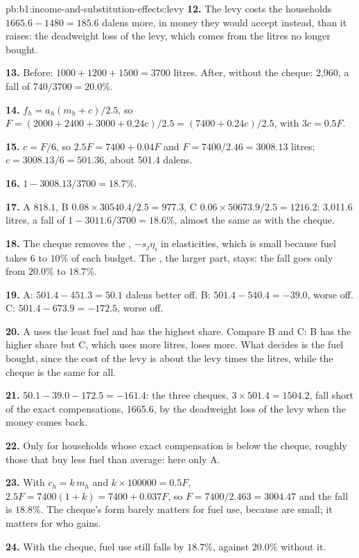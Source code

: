 \begin{solution}{pb:b1:income-and-substitution-effects:levy}
\textbf{12.} The levy costs the households $1665.6 - 1480 = 185.6$ dalens more,
in money they would accept instead, than it raises: the deadweight loss of
the levy, which comes from the litres no longer bought.

\textbf{13.} Before: $1000 + 1200 + 1500 = 3700$ litres. After, without the cheque:
2,960, a fall of $740/3700 = 20.0\%$.

\textbf{14.} $f_h = a_h(m_h + c)/2.5$, so
$F = (2000 + 2400 + 3000 + 0.24c)/2.5 = (7400 + 0.24c)/2.5$, with $3c = 0.5F$.

\textbf{15.} $c = F/6$, so $2.5F = 7400 + 0.04F$ and $F = 7400/2.46 = 3008.13$ litres;
$c = 3008.13/6 = 501.36$, about 501.4 dalens.

\textbf{16.} $1 - 3008.13/3700 = 18.7\%$.

\textbf{17.} A $818.1$, B $0.08 \times 30540.4/2.5 = 977.3$, C $0.06 \times 50673.9/2.5 = 1216.2$:
3,011.6 litres, a fall of $1 - 3011.6/3700 = 18.6\%$, almost the same as with the
cheque.

\textbf{18.} The cheque removes the , $-s_j\eta_i$ in elasticities,
which is small because fuel takes $6$ to $10\%$ of each budget. The
, the larger part, stays: the fall goes only from
$20.0\%$ to $18.7\%$.

\textbf{19.} A: $501.4 - 451.3 = 50.1$ dalens better off. B: $501.4 - 540.4 = -39.0$,
worse off. C: $501.4 - 673.9 = -172.5$, worse off.

\textbf{20.} A uses the least fuel and has the highest share. Compare B and C:
B has the higher share but C, which uses more litres, loses more. What
decides is the fuel bought, since the cost of the levy is about the levy
times the litres, while the cheque is the same for all.

\textbf{21.} $50.1 - 39.0 - 172.5 = -161.4$: the three cheques, $3 \times 501.4 = 1504.2$,
fall short of the exact compensations, 1665.6, by the deadweight loss of the
levy when the money comes back.

\textbf{22.} Only for households whose exact compensation is below the cheque,
roughly those that buy less fuel than average: here only A.

\textbf{23.} With $c_h = k\,m_h$ and $k \times 100000 = 0.5F$,
$2.5F = 7400(1 + k) = 7400 + 0.037F$, so $F = 7400/2.463 = 3004.47$ and the fall is
$18.8\%$. The cheque's form barely matters for fuel use, because 
are small; it matters for who gains.

\textbf{24.} With the cheque, fuel use still falls by $18.7\%$, against $20.0\%$
without it.
\end{solution}
